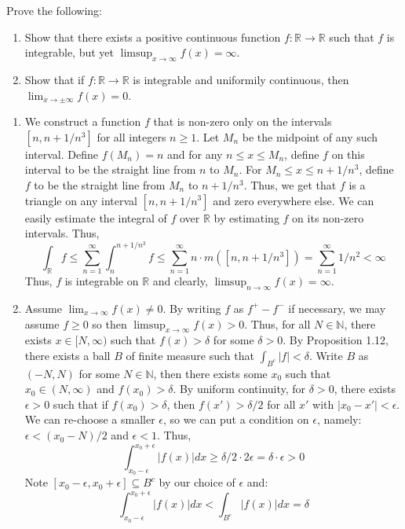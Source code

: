 \documentclass[12pt]{article}
\newenvironment{solution}[2][Solution]{\begin{trivlist}
\item[\hskip \labelsep {\bfseries #1}]}{\end{trivlist}}
\newenvironment{problem}[2][Problem]{\begin{trivlist}
\item[\hskip \labelsep {\bfseries #1}\hskip \labelsep {\bfseries #2.}]}{\end{trivlist}}
\begin{document}
\begin{problem}{2}
    Prove the following:
    \begin{enumerate}
        \item Show that there exists a positive continuous function $f:\mathbb{R}\to\mathbb{R}$ such that $f$ is integrable, but yet $\limsup_{x\to\infty} f(x) = \infty$.
        \item Show that if $f:\mathbb{R}\to\mathbb{R}$ is integrable and uniformily continuous, then $\lim_{x\to\pm\infty}f(x)=0$.
    \end{enumerate}
\end{problem}

\begin{solution}{}
	\begin{enumerate}
		\item[(i.)] We construct a function $f$ that is non-zero only on the intervals $[n,n+1/n^3]$ for all integers $n\geq 1$. Let $M_n$ be the midpoint of any such interval.
		Define $f(M_n) = n$ and for any $n \leq x \leq M_n$, define $f$ on this interval to be the straight line from $n$ to $M_n$. For $M_n \leq x\leq n+1/n^3$, define
		$f$ to be the straight line from $M_n$ to $n+1/n^3$. Thus, we get that $f$ is a triangle on any interval $[n,n+1/n^3]$ and zero everywhere else. We can easily
		estimate the integral of $f$ over $\mathbb{R}$ by estimating $f$ on its non-zero intervals. Thus,
		\[ \int_{\mathbb{R}} f \leq \sum_{n=1}^{\infty} \int_{n}^{n+1/n^3} f \leq \sum_{n=1}^{\infty} n\cdot m([n,n+1/n^3]) = \sum_{n=1}^{\infty} 1/n^2 < \infty \]
		Thus, $f$ is integrable on $\mathbb{R}$ and clearly, $\limsup_{n\to\infty} f(x) = \infty$.
		\item[(ii.)] Assume $\lim_{x\to\infty} f(x) \neq 0$. By writing $f$ as $f^{+} - f^{-}$ if necessary, we may assume $f\geq 0$ so then $\limsup_{x\to\infty} f(x)>0$.
		Thus, for all $N\in\mathbb{N}$, there exists $x\in[N,\infty)$ such that $f(x)>\delta$ for some $\delta>0$. By Proposition 1.12, there exists a ball $B$ of finite
		measure such that $\int_{B^c} |f| < \delta$. Write $B$ as $(-N,N)$ for some $N\in\mathbb{N}$, then there exists some $x_0$ such that $x_0\in (N,\infty)$ and
		$f(x_0)>\delta$. By uniform continuity, for $\delta>0$, there exists $\epsilon>0$ such that if $f(x_0)>\delta$, then $f(x')>\delta/2$ for all $x'$ with $|x_0-x'|<\epsilon$.
		We can re-choose a smaller $\epsilon$, so we can put a condition on $\epsilon$, namely: $\epsilon < (x_0-N)/2$ and $\epsilon < 1$. Thus,
		\[ \int_{x_0-\epsilon}^{x_0+\epsilon} |f(x)|dx \geq \delta/2 \cdot 2\epsilon = \delta \cdot \epsilon > 0 \]
		Note $[x_0-\epsilon, x_0+\epsilon]\subseteq B^c$ by our choice of $\epsilon$ and:
		\[ \int_{x_0-\epsilon}^{x_0+\epsilon} |f(x)|dx < \int_{B^c} |f(x)|dx = \delta \]
		

\end{enumerate}
\end{solution}
\end{document}
